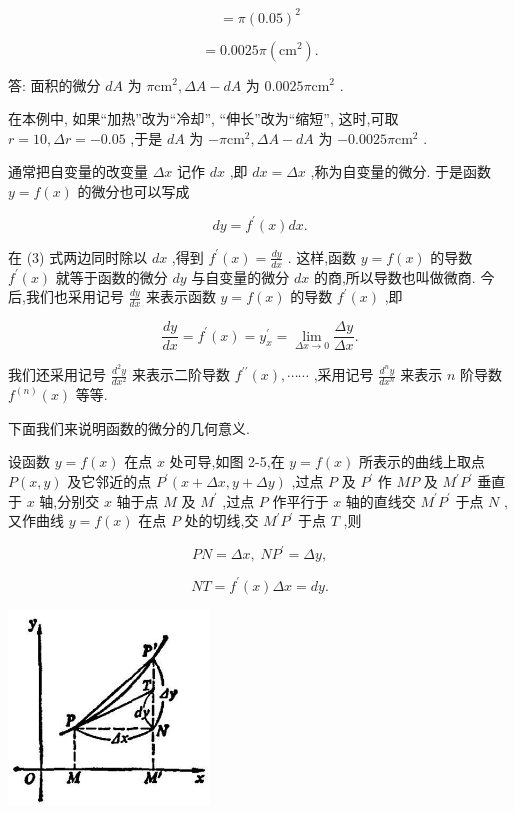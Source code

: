 \documentclass[lang=cn,newtx,10pt,scheme=chinese]{elegantbook}
\begin{document}
\[
= \pi {\left( {0.05}\right) }^{2}
\]

\[
= {0.0025\pi }\left( {\mathrm{{cm}}}^{2}\right) \text{.}
\]

答: 面积的微分 \({dA}\) 为 \(\pi {\mathrm{{cm}}}^{2},{\Delta A} - {dA}\) 为 \({0.0025\pi }{\mathrm{{cm}}}^{2}\) .

在本例中, 如果“加热”改为“冷却”, “伸长”改为“缩短”, 这时,可取 \(r = {10},{\Delta r} = - {0.05}\) ,于是 \({dA}\) 为 \(- \pi {\mathrm{{cm}}}^{2},{\Delta A} - {dA}\) 为 \(- {0.0025\pi }{\mathrm{{cm}}}^{2}\) .

通常把自变量的改变量 \({\Delta x}\) 记作 \({dx}\) ,即 \({dx} = {\Delta x}\) ,称为自变量的微分. 于是函数 \(y = f\left( x\right)\) 的微分也可以写成

\[
{dy} = {f}^{\prime }\left( x\right) {dx}. \tag{3}
\]

在 (3) 式两边同时除以 \({dx}\) ,得到 \({f}^{\prime }\left( x\right) = \frac{dy}{dx}\) . 这样,函数 \(y = f\left( x\right)\) 的导数 \({f}^{\prime }\left( x\right)\) 就等于函数的微分 \({dy}\) 与自变量的微分 \({dx}\) 的商,所以导数也叫做微商. 今后,我们也采用记号 \(\frac{dy}{dx}\) 来表示函数 \(y = f\left( x\right)\) 的导数 \({f}^{\prime }\left( x\right)\) ,即

\[
\frac{dy}{dx} = {f}^{\prime }\left( x\right) = {y}_{x}^{\prime } = \mathop{\lim }\limits_{{{\Delta x} \rightarrow 0}}\frac{\Delta y}{\Delta x}.
\]

我们还采用记号 \(\frac{{d}^{2}y}{d{x}^{2}}\) 来表示二阶导数 \({f}^{\prime \prime }\left( x\right) ,\cdots \cdots\) ,采用记号 \(\frac{{d}^{n}y}{d{x}^{n}}\) 来表示 \(n\) 阶导数 \({f}^{\left( n\right) }\left( x\right)\) 等等.

下面我们来说明函数的微分的几何意义.

设函数 \(y = f\left( x\right)\) 在点 \(x\) 处可导,如图 2-5,在 \(y = f\left( x\right)\) 所表示的曲线上取点 \(P\left( {x,y}\right)\) 及它邻近的点 \({P}^{\prime }\left( {x + {\Delta x},y + {\Delta y}}\right)\) ,过点 \(P\) 及 \({P}^{\prime }\) 作 \({MP}\) 及 \({M}^{\prime }{P}^{\prime }\) 垂直于 \(x\) 轴,分别交 \(x\) 轴于点 \(M\) 及 \({M}^{\prime }\) ,过点 \(P\) 作平行于 \(x\) 轴的直线交 \({M}^{\prime }{P}^{\prime }\) 于点 \(N\) ,又作曲线 \(y = f\left( x\right)\) 在点 \(P\) 处的切线,交 \({M}^{\prime }{P}^{\prime }\) 于点 \(T\) ,则

\[
{PN} = {\Delta x},\;N{P}^{\prime } = {\Delta y},
\]

\[
{NT} = {f}^{\prime }\left( x\right) {\Delta x} = {dy}.
\]

\begin{center}
\includegraphics[max width=0.4\textwidth]{images/01912c18-5c3f-733d-b775-749ba9897a9d_113_880246.jpg}
\end{center}
\end{document}
